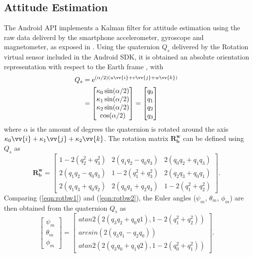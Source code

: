 \subsection{Attitude Estimation}
The Android API implements a Kalman filter for attitude estimation using the raw data deliverd by the smartphone accelerometer, gyroscope and magnetometer, as exposed in \cite{Astudillo2017}. Using the quaternion $Q_s$ delivered by the Rotation virtual sensor included in the Android SDK, it is obtained an absolute orientation representation with respect to the Earth frame \cite{AndSensor}, with
\begin{align}\label{eqn:rotvector}
\begin{split}
Q_{s} &= \mathrm{e}^{(\alpha/2)(u\vv{i}+v\vv{j}+w\vv{k})} \\
&= \begin{bmatrix}
\kappa_{0}\sin(\alpha / 2)\\
\kappa_{1}\sin(\alpha / 2)\\
\kappa_{2}\sin(\alpha / 2)\\
\cos(\alpha / 2)
\end{bmatrix} = \begin{bmatrix}
q_{0} \\
q_{1} \\
q_{2} \\
q_{3}
\end{bmatrix}
\end{split}
\end{align}
where $\alpha$ is the amount of degrees the quaternion is rotated around the axis $\kappa_{0}\vv{i}+\kappa_{1}\vv{j}+\kappa_{2}\vv{k}$. The rotation matrix $\mathbf{R_{b}^{w}}$ can be defined using $Q_s$ as
\begin{equation}
\label{eqn:rotbw2}
\mathbf{R_{b}^{w}} = \begin{bmatrix}
1-2(q_{2}^{2}+q_{3}^{2}) & 2(q_{1}q_{2}-q_{0}q_{3}) & 2(q_{0}q_{2}+q_{1}q_{3}) \\
2(q_{1}q_{2}-q_{0}q_{3}) & 1-2(q_{1}^{2}+q_{3}^{2}) & 2(q_{2}q_{3}+q_{0}q_{1}) \\
2(q_{1}q_{3}+q_{0}q_{2}) & 2(q_{0}q_{1}+q_{2}q_{3}) & 1-2(q_{1}^{2}+q_{2}^{2})
\end{bmatrix}.
\end{equation}
Comparing (\ref{eqn:rotbw1}) and (\ref{eqn:rotbw2}), the Euler angles ($\psi_{m}$, $\theta_m$, $\phi_m$) are then obtained from the quaternion $Q_s$ as
\begin{equation}\label{eqn:quattoeu}
\begin{bmatrix}
\psi_{m} \\
\theta_{m} \\
\phi_{m}
\end{bmatrix} =
\begin{bmatrix}
atan2(2(q_{3}q_{2} + q_{0}q{1}),1-2(q_{1}^{2} + q_{2}^{2})) \\
arcsin(2(q_{3}q_{1} - q_{2}q_{0})) \\
atan2(2(q_{3}q_{0} + q_{1}q{2}),1-2(q_{0}^{2} + q_{1}^{2})) 
\end{bmatrix}.
\end{equation}

